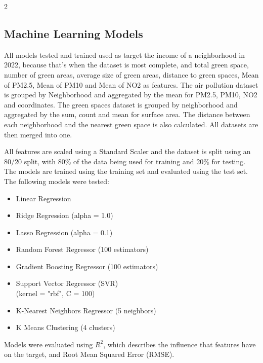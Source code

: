 \documentclass[12pt, a4paper]{article}
\begin{document}
\begin{multicols}{2}
    \subsection{Machine Learning Models}
    All models tested and trained used as target the income of a neighborhood in 2022, because that's when the dataset is most complete, and total green space, number of green areas, average size of green areas, distance to green spaces, Mean of PM2.5, Mean of PM10 and Mean of NO2 as features. The air pollution dataset is grouped by Neighborhood and aggregated by the mean for PM2.5, PM10, NO2 and coordinates.
    The green spaces dataset is grouped by neighborhood and aggregated by the sum, count and mean for surface area. The distance between each neighborhood and the nearest green space is also calculated.
    All datasets are then merged into one.

    All features are scaled using a Standard Scaler and the dataset is split using an 80/20 split, with 80\% of the data being used for training and 20\% for testing. The models are trained using the training set and evaluated using the test set.
    The following models were tested:
    \begin{itemize}
        \item Linear Regression
        \item Ridge Regression (alpha = 1.0)
        \item Lasso Regression (alpha = 0.1)
        \item Random Forest Regressor (100 estimators)
        \item Gradient Boosting Regressor (100 estimators)
        \item Support Vector Regressor (SVR) \\ (kernel = "rbf", C = 100)
        \item K-Nearest Neighbors Regressor (5 neighbors)
        \item K Means Clustering (4 clusters)
    \end{itemize}
    Models were evaluated using $R^2$, which describes the influence that features have on the target, and Root Mean Squared Error (RMSE).

\end{multicols}
\end{document}
